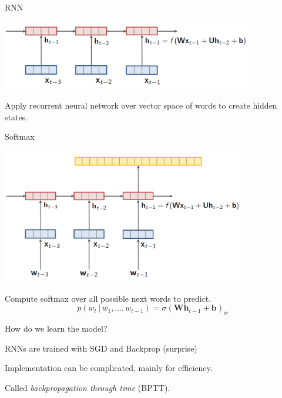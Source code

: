 \documentclass{beamer}
\let\tempone\itemize
\let\temptwo\enditemize
\renewenvironment{itemize}{\tempone\addtolength{\itemsep}{0.5\baselineskip}}{\temptwo}
\newcommand{\air}{\vspace{0.25cm}}
\newcommand{\given}{\,|\,}
\begin{document}
\begin{frame}{RNN}
  \begin{center}
    \includegraphics[width=11cm]{rnn}
  \end{center}  
  \begin{itemize}
  \item Apply recurrent neural network over vector space of words to create hidden states.
  \end{itemize}
\end{frame}




\begin{frame}{Softmax}
  \begin{center}

    \includegraphics[width=0.8\textwidth]{rnnlm5}
  \end{center}

  \begin{itemize}
  \item Compute softmax over all possible next words to predict.
  \end{itemize}
  \[  p(w_t \given w_1, \ldots, w_{t-1}) = \sigma(\mathbf{W} \mathbf{h}_{t-1} + \mathbf{b})_w \] 

\end{frame}

\begin{frame}{How do we learn the model?}
  \begin{itemize}
  \item RNNs are trained with SGD and Backprop (surprise)
    \air 

  \item Implementation can be complicated, mainly for efficiency.
    \air

  \item Called \textit{backpropagation through time} (BPTT).
  \end{itemize}
\end{frame}
\end{document}
